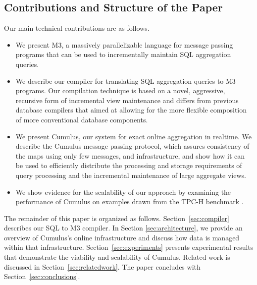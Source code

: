 \subsection{Contributions and Structure of the Paper}


Our main technical contributions are as follows.
\begin{itemize}
\item
We present M3, a massively parallelizable language
for message passing programs that can be used to incrementally maintain
SQL aggregation queries.

\item
We describe our compiler for translating SQL aggregation queries to M3
programs. Our compilation technique is based on a novel, aggressive, recursive
form of incremental view maintenance and differs from previous
database compilers \cite{DBLP:conf/pods/Batory88,DBLP:journals/jiis/BatoryT97}
that aimed at allowing for the more flexible composition of
more conventional database components.

\item
We present Cumulus, our system for exact online aggregation in realtime.
We describe the Cumulus message passing protocol, which assures
consistency of the maps using only few messages, and
infrastructure, and show how it can be used to efficiently distribute the
processing and storage requirements of query processing and
the incremental maintenance of large aggregate views.

\item
We show evidence for the scalability of our approach by examining the
performance of Cumulus on examples drawn from the TPC-H benchmark
\cite{tpch2008}.
\end{itemize}


The remainder of this paper is organized as follows.
Section~\ref{sec:compiler} describes our SQL to M3 compiler.
In Section \ref{sec:architecture}, we provide an overview of Cumulus's online
infrastructure and discuss how data is managed within that infrastructure.
Section~\ref{sec:experiments} presents
experimental results that demonstrate the viability and scalability of
Cumulus. Related work is discussed in Section~\ref{sec:relatedwork}.
The paper concludes with Section~\ref{sec:conclusions}.




